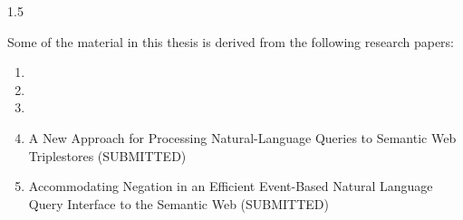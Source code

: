 \documentclass[fleqn, oneside, 12pt]{book}
\theoremstyle{definitionsty}
\newcommand{\uwinonehalfspacelen}{1.5}
\newcommand{\uwindefaultspacelen}{\uwinonehalfspacelen}
\newenvironment{uwindefaultspaceenv}%
{\begin{spacing}{\uwindefaultspacelen}}%
	{\end{spacing}}
\begin{document}
\begin{uwindefaultspaceenv}


	Some of the material in this thesis is derived from the following research
	papers:










\end{uwindefaultspaceenv}





\begin{enumerate}
    \item {}

    \item {}

    \item {}

    \item A New Approach for Processing Natural-Language Queries to Semantic Web Triplestores (SUBMITTED) %

    \item Accommodating Negation in an Efficient Event-Based Natural Language Query Interface to the Semantic Web (SUBMITTED) %
\end{enumerate}
\end{document}
